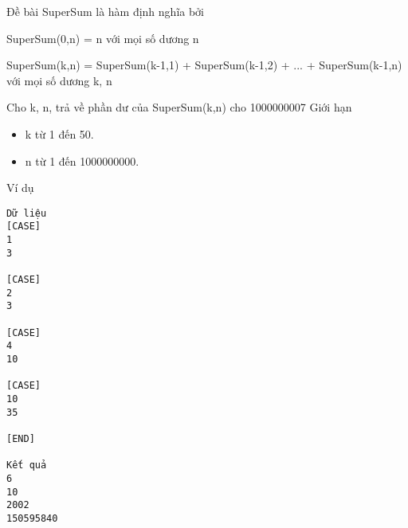 Đề bài
SuperSum là hàm định nghĩa bởi  

   SuperSum(0,n) = n với mọi số dương n  

   SuperSum(k,n) = SuperSum(k-1,1) + SuperSum(k-1,2) + ... + SuperSum(k-1,n) với mọi số dương k, n  

   Cho k, n, trả về phần dư của SuperSum(k,n) cho 1000000007
Giới hạn
\begin{itemize}
	\item     k từ 1 đến 50.   
	\item     n từ 1 đến 1000000000.   
\end{itemize}
Ví dụ
\begin{verbatim}
Dữ liệu
[CASE]
1
3

[CASE]
2
3

[CASE]
4
10

[CASE]
10
35

[END]

Kết quả
6
10
2002
150595840
\end{verbatim}